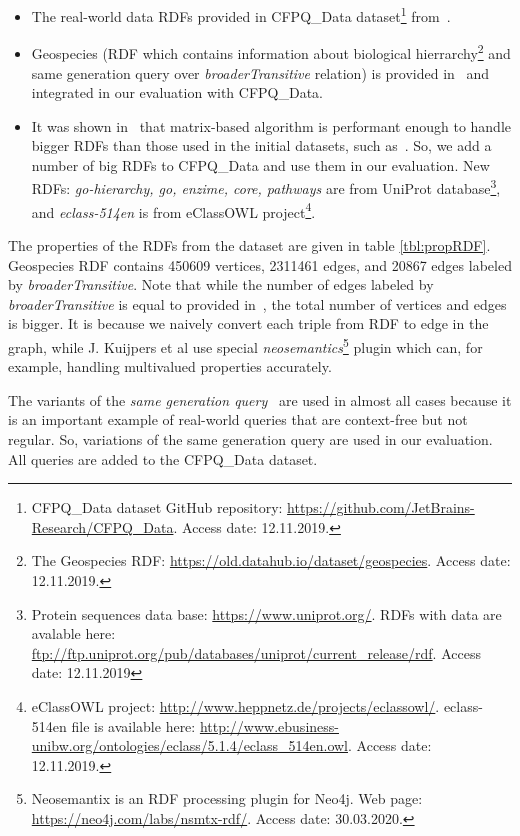 \begin{itemize}
\item The real-world data RDFs provided in CFPQ\_Data dataset\footnote{CFPQ\_Data dataset GitHub repository: \url{https://github.com/JetBrains-Research/CFPQ_Data}. Access date: 12.11.2019.} from~\cite{Mishin:2019:ECP:3327964.3328503}.
\item Geospecies (RDF which contains information about biological hierrarchy\footnote{The Geospecies RDF: \url{https://old.datahub.io/dataset/geospecies}. Access date: 12.11.2019.} and same generation query over \textit{broaderTransitive} relation) is provided in~\cite{Kuijpers:2019:ESC:3335783.3335791} and integrated in our evaluation with CFPQ\_Data.
\item It was shown in~\cite{Mishin:2019:ECP:3327964.3328503} that matrix-based algorithm is performant enough to handle bigger RDFs than those used in the initial datasets, such as~\cite{RDF}.
So, we add a number of big RDFs to CFPQ\_Data and use them in our evaluation.
New RDFs: \textit{go-hierarchy, go, enzime, core, pathways} are from UniProt database\footnote{Protein sequences data base: \url{https://www.uniprot.org/}. RDFs with data are avalable here: \url{ftp://ftp.uniprot.org/pub/databases/uniprot/current_release/rdf}. Access date: 12.11.2019}, and \textit{eclass-514en} is from eClassOWL project\footnote{eClassOWL project: \url{http://www.heppnetz.de/projects/eclassowl/}. eclass-514en file is available here: \url{http://www.ebusiness-unibw.org/ontologies/eclass/5.1.4/eclass_514en.owl}. Access date: 12.11.2019.}.
\end{itemize}

The properties of the RDFs from the dataset are given in table \ref{tbl:propRDF}. 
Geospecies RDF contains 450609 vertices, 2311461 edges, and 20867 edges labeled by \textit{broaderTransitive}.
Note that while the number of edges labeled by \textit{broaderTransitive} is equal to provided in~\cite{Kuijpers:2019:ESC:3335783.3335791}, the total number of vertices and edges is bigger. It is because we naively convert each triple from RDF to edge in the graph, while J. Kuijpers et al use special \textit{neosemantics}\footnote{Neosemantix is an RDF processing plugin for Neo4j. Web page: \url{https://neo4j.com/labs/nsmtx-rdf/}. Access date: 30.03.2020.} plugin which can, for example, handling multivalued properties accurately.  



The variants of the \textit{same generation query}~\cite{FndDB} are used in almost all cases because it is an important example of real-world queries that are context-free but not regular.
So, variations of the same generation query are used in our evaluation.
All queries are added to the CFPQ\_Data dataset.

